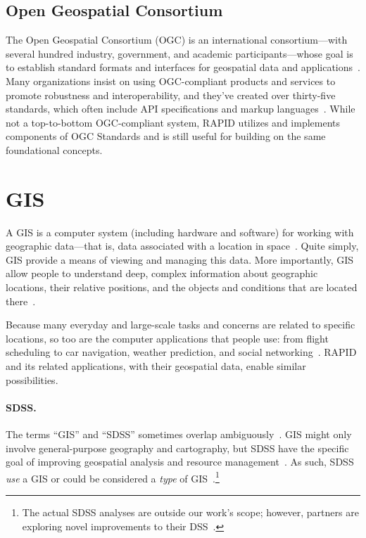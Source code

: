 \subsection{Open Geospatial Consortium}
The Open Geospatial Consortium (OGC) is an international consortium---with several hundred industry, government, and academic participants---whose goal is to establish standard formats and interfaces for geospatial data and applications~\cite{ogc}. Many organizations insist on using OGC-compliant products and services to promote robustness and interoperability, and they've created over thirty-five standards, which often include API specifications and markup languages~\cite{ogc,Dunning2013}. While not a top-to-bottom OGC-compliant system, RAPID utilizes and implements components of OGC Standards and is still useful for building on the same foundational concepts.

\section{GIS}
A GIS is a computer system (including hardware and software) for working with geographic data---that is, data associated with a location in space~\cite{Esriintro,gentle_intro}. Quite simply, GIS provide a means of viewing and managing this data. More importantly, GIS allow people to understand deep, complex information about geographic locations, their relative positions, and the objects and conditions that are located there~\cite{Esriintro,gentle_intro}.

Because many everyday and large-scale tasks and concerns are related to specific locations, so too are the computer applications that people use: from flight scheduling to car navigation, weather prediction, and social networking~\cite{Esriintro}. RAPID and its related applications, with their geospatial data, enable similar possibilities.

\paragraph{SDSS.}
The terms ``GIS'' and ``SDSS'' sometimes overlap ambiguously~\cite{Peterson}. GIS might only involve general-purpose geography and cartography, but SDSS have the specific goal of improving geospatial analysis and resource management~\cite{Peterson}. As such, SDSS \textit{use} a GIS or could be considered a \textit{type} of GIS~\cite{Peterson}.\footnote{The actual SDSS analyses are outside our work's scope; however, partners are exploring novel improvements to their DSS~\cite{Dunning2013}.}

